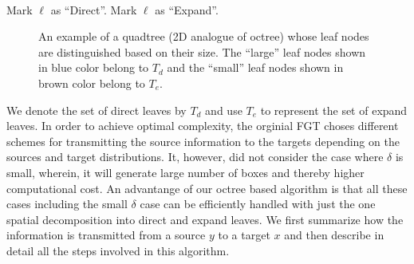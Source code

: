 {\tt
\begin{algorithmic}
\STATE
          \STATE Mark $\ell$ as ``Direct''. 
      \ELSE
          \STATE Mark $\ell$ as ``Expand''. 
      \ENDIF
  \ENDFOR
\STATE
\end{algorithmic}
}

\begin{figure}
\begin{center}
\caption{\label{f:directExpand} An example of a quadtree (2D analogue of octree) whose leaf nodes are distinguished based 
on their size. The ``large'' leaf nodes shown in blue color belong to $T_d$ and 
the ``small'' leaf nodes shown in brown color belong to $T_e$.}  
\end{center}
\end{figure}

We denote the set of direct leaves by $T_d$ and use $T_e$ to represent the set of expand leaves. In order to achieve optimal complexity, the orginial FGT \cite{fgt} choses different schemes for transmitting the source information to the targets 
depending on the sources and target distributions. It, however, did not consider the case where $\delta$ is small, wherein, it will generate large number of boxes and thereby higher computational cost. An advantange of our octree based algorithm is that all these cases including the small $\delta$ case can be efficiently handled with just the one spatial decomposition into direct and expand leaves. We first summarize how the information is transmitted from a source $y$ to a target $x$ and then describe in detail all the steps involved in this algorithm.

